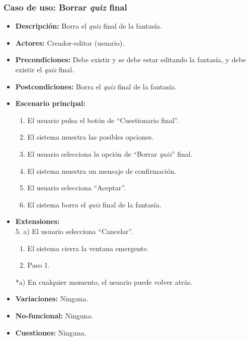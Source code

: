 \subsubsection{Caso de uso: Borrar \textit{quiz} final}
\begin{itemize}
	\item \textbf{Descripción:} Borra el \textit{quiz} final de la fantasía.
	\item \textbf{Actores:} Creador-editor (usuario).
	\item \textbf{Precondiciones:} Debe existir y se debe estar editando la fantasía, y debe existir el \textit{quiz} final.
	\item \textbf{Postcondiciones:} Borra el \textit{quiz} final de la fantasía.
	\item \textbf{Escenario principal:}
	\begin{enumerate}
		\item El usuario pulsa el botón de ``Cuestionario final''.
		\item El sistema muestra las posibles opciones.
		\item El usuario selecciona la opción de ``Borrar \textit{quiz}'' final.
		\item El sistema muestra un mensaje de confirmación.
		\item El usuario selecciona ``Aceptar''.
		\item El sistema borra el \textit{quiz} final de la fantasía.
	\end{enumerate}
	\item \textbf{Extensiones:} \\ 5. a) El usuario selecciona ``Cancelar''.
	\begin{enumerate}
		\item El sistema cierra la ventana emergente.
		\item Paso 1.
	\end{enumerate}
	*a) En cualquier momento, el usuario puede volver atrás.
	\item \textbf{Variaciones:} Ninguna.
	\item \textbf{No-funcional:} Ninguna.
	\item \textbf{Cuestiones:} Ninguna.
\end{itemize}


